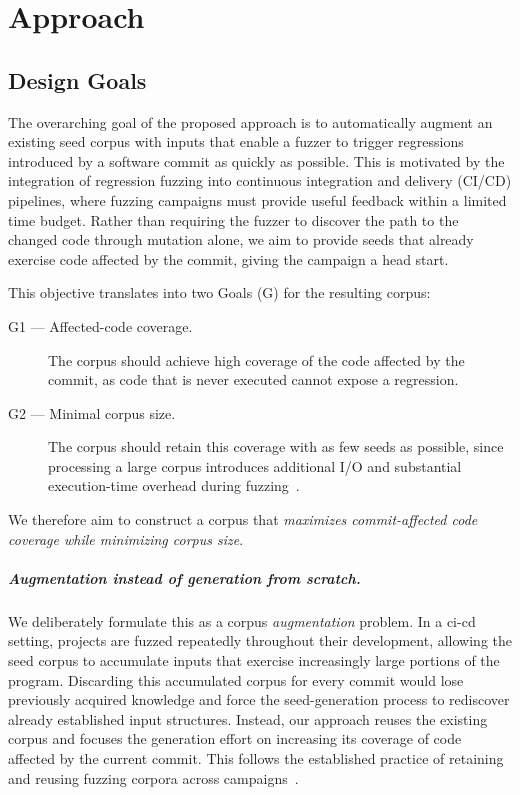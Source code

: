 
\chapter{Approach}\label{chapter:approach}
\section{Design Goals}
\label{sec:design-goals}



The overarching goal of the proposed approach is to automatically augment an
existing seed corpus with inputs that enable a fuzzer to trigger regressions
introduced by a software commit as quickly as possible. This is motivated by the
integration of regression fuzzing into continuous integration and delivery
(CI/CD) pipelines, where fuzzing campaigns must provide useful feedback within a
limited time budget. Rather than requiring the fuzzer to discover the path to the
changed code through mutation alone, we aim to provide seeds that already
exercise code affected by the commit, giving the campaign a head start.

This objective translates into two Goals (G) for the resulting corpus:

\begin{description}
  \item[G1 --- Affected-code coverage.] The corpus should achieve high coverage
    of the code affected by the commit, as code that is never executed
    cannot expose a regression.
  \item[G2 --- Minimal corpus size.] The corpus should retain this coverage with
    as few seeds as possible, since processing a large corpus introduces
    additional I/O and substantial execution-time overhead during
    fuzzing~\cite{herreraCorpusDistillationEffective2020}.
\end{description}

\noindent
We therefore aim to construct a corpus that \emph{maximizes commit-affected code
coverage while minimizing corpus size}.

\paragraph{Augmentation instead of generation from scratch.}
We deliberately formulate this as a corpus \emph{augmentation} problem. In a
\ac{ci-cd} setting, projects are fuzzed repeatedly throughout their development,
allowing the seed corpus to accumulate inputs that exercise increasingly large
portions of the program. Discarding this accumulated corpus for every commit
would lose previously acquired knowledge and force the seed-generation process to
rediscover already established input structures. Instead, our approach reuses the
existing corpus and focuses the generation effort on increasing its coverage of
code affected by the current commit. This follows the established practice of
retaining and reusing fuzzing corpora across
campaigns~\cite{liImprovingSeedQuality2025}.


